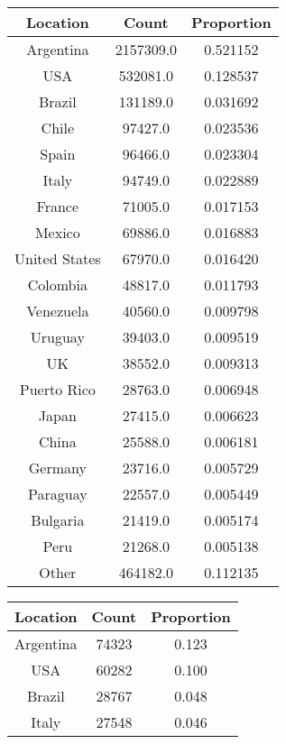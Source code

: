 \begin{table}[H]
\begin{subtable}[c]{0.5\textwidth}
\centering
\begin{tabular}{|c|c|c|}
\hline
    \textbf{Location} & \textbf{Count} & \textbf{Proportion} \\
    \hline
    Argentina & 2157309.0 & 0.521152 \\
    USA & 532081.0 & 0.128537 \\
    Brazil & 131189.0 & 0.031692 \\
    Chile & 97427.0 & 0.023536 \\
    Spain & 96466.0 & 0.023304 \\
    Italy & 94749.0 & 0.022889 \\
    France & 71005.0 & 0.017153 \\
    Mexico & 69886.0 & 0.016883 \\
    United States & 67970.0 & 0.016420 \\
    Colombia & 48817.0 & 0.011793 \\
    Venezuela & 40560.0 & 0.009798 \\
    Uruguay & 39403.0 & 0.009519 \\
    UK & 38552.0 & 0.009313 \\
    Puerto Rico & 28763.0 & 0.006948 \\
    Japan & 27415.0 & 0.006623 \\
    China & 25588.0 & 0.006181 \\
    Germany & 23716.0 & 0.005729 \\
    Paraguay & 22557.0 & 0.005449 \\
    Bulgaria & 21419.0 & 0.005174 \\
    Peru & 21268.0 & 0.005138 \\
    Other & 464182.0 & 0.112135 \\
    \hline
    \end{tabular}
\end{subtable}
\begin{subtable}[c]{0.5\textwidth}
\centering
\begin{tabular}{|c|c|c|}
\hline
    \textbf{Location} & \textbf{Count} & \textbf{Proportion} \\
    \hline
    Argentina & 74323 & 0.123 \\
    USA & 60282 & 0.100 \\
    Brazil & 28767 & 0.048 \\
    Italy & 27548 & 0.046 \\

\end{tabular}
\end{subtable}
\end{table}
